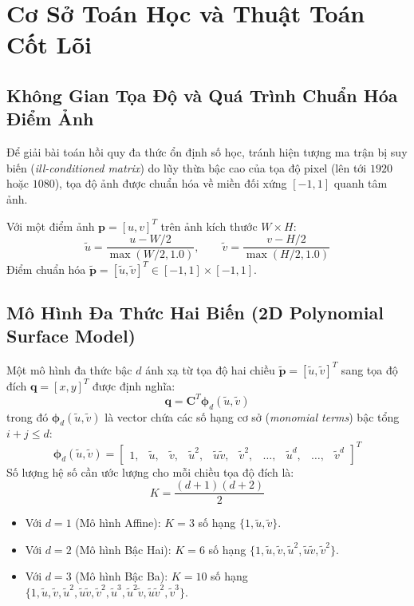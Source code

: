 \documentclass[11pt,a4paper]{article}
\begin{document}
\section{Cơ Sở Toán Học và Thuật Toán Cốt Lõi}

\subsection{Không Gian Tọa Độ và Quá Trình Chuẩn Hóa Điểm Ảnh}
Để giải bài toán hồi quy đa thức ổn định số học, tránh hiện tượng ma trận bị suy biến (\textit{ill-conditioned matrix}) do lũy thừa bậc cao của tọa độ pixel (lên tới $1920$ hoặc $1080$), tọa độ ảnh được chuẩn hóa về miền đối xứng $[-1, 1]$ quanh tâm ảnh.

Với một điểm ảnh $\mathbf{p} = [u, v]^T$ trên ảnh kích thước $W \times H$:
\begin{equation}
    \tilde{u} = \frac{u - W/2}{\max(W/2, 1.0)}, \qquad \tilde{v} = \frac{v - H/2}{\max(H/2, 1.0)}
\end{equation}
Điểm chuẩn hóa $\tilde{\mathbf{p}} = [\tilde{u}, \tilde{v}]^T \in [-1, 1] \times [-1, 1]$.

\subsection{Mô Hình Đa Thức Hai Biến (2D Polynomial Surface Model)}
Một mô hình đa thức bậc $d$ ánh xạ từ tọa độ hai chiều $\tilde{\mathbf{p}} = [\tilde{u}, \tilde{v}]^T$ sang tọa độ đích $\mathbf{q} = [x, y]^T$ được định nghĩa:
\begin{equation}
    \mathbf{q} = \mathbf{C}^T \bm{\phi}_d(\tilde{u}, \tilde{v})
\end{equation}
trong đó $\bm{\phi}_d(\tilde{u}, \tilde{v})$ là vector chứa các số hạng cơ sở (\textit{monomial terms}) bậc tổng $i + j \le d$:
\begin{equation}
    \bm{\phi}_d(\tilde{u}, \tilde{v}) = \begin{bmatrix} 1, & \tilde{u}, & \tilde{v}, & \tilde{u}^2, & \tilde{u}\tilde{v}, & \tilde{v}^2, & \dots, & \tilde{u}^d, & \dots, & \tilde{v}^d \end{bmatrix}^T
\end{equation}
Số lượng hệ số cần ước lượng cho mỗi chiều tọa độ đích là:
\begin{equation}
    K = \frac{(d + 1)(d + 2)}{2}
\end{equation}
\begin{itemize}
    \item Với $d=1$ (Mô hình Affine): $K = 3$ số hạng $\{1, \tilde{u}, \tilde{v}\}$.
    \item Với $d=2$ (Mô hình Bậc Hai): $K = 6$ số hạng $\{1, \tilde{u}, \tilde{v}, \tilde{u}^2, \tilde{u}\tilde{v}, \tilde{v}^2\}$.
    \item Với $d=3$ (Mô hình Bậc Ba): $K = 10$ số hạng $\{1, \tilde{u}, \tilde{v}, \tilde{u}^2, \tilde{u}\tilde{v}, \tilde{v}^2, \tilde{u}^3, \tilde{u}^2\tilde{v}, \tilde{u}\tilde{v}^2, \tilde{v}^3\}$.
\end{itemize}
\end{document}
